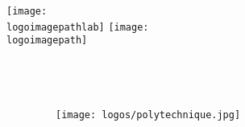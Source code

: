 



{
	\begin{specialframe}
      	\texttt{[image: \\logoimagepathlab]}
      	\hfill
		\texttt{[image: \\logoimagepath]}

\begin{center}
{\Huge \textcolor{polyred}{\textbf{\scshape{\slidesettitle}}}} \\
\vspace{5pt}
\normalsize{\textcolor{polyorange}{\textbf{\slidesetsubtitle}}}
\end{center}

\begin{block}{}
			\begin{columns}
				
							
				\newline \\	
				\normalsize{\textbf{\authorname}} \\
				{\footnotesize \textit{\coauthors}} \\
				{\footnotesize \authoremail} \\
				\vspace{15pt}
				{\footnotesize \authoraffiliation \\ \institution}\\				\vspace{15pt}
				{\footnotesize \textcolor{gray}{\insertdate}}
				
				\begin{figure}
					\centering
					\texttt{[image: logos/polytechnique.jpg]}
				\end{figure}
				
			\end{columns}
		\end{block}

\end{specialframe}
}

